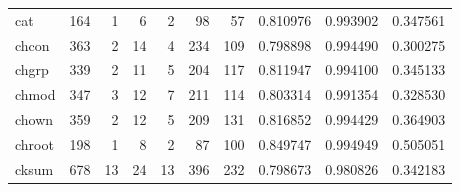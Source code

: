 \begin{tabular}{lrrrrrrrrr}
cat       &                    164 &                                  1 &                                 6 &                                2 &                                98 &                              57 &                                0.810976 &                               0.993902 &                             0.347561 \\
chcon     &                    363 &                                  2 &                                14 &                                4 &                               234 &                             109 &                                0.798898 &                               0.994490 &                             0.300275 \\
chgrp     &                    339 &                                  2 &                                11 &                                5 &                               204 &                             117 &                                0.811947 &                               0.994100 &                             0.345133 \\
chmod     &                    347 &                                  3 &                                12 &                                7 &                               211 &                             114 &                                0.803314 &                               0.991354 &                             0.328530 \\
chown     &                    359 &                                  2 &                                12 &                                5 &                               209 &                             131 &                                0.816852 &                               0.994429 &                             0.364903 \\
chroot    &                    198 &                                  1 &                                 8 &                                2 &                                87 &                             100 &                                0.849747 &                               0.994949 &                             0.505051 \\
cksum     &                    678 &                                 13 &                                24 &                               13 &                               396 &                             232 &                                0.798673 &                               0.980826 &                             0.342183 \\

\end{tabular}
